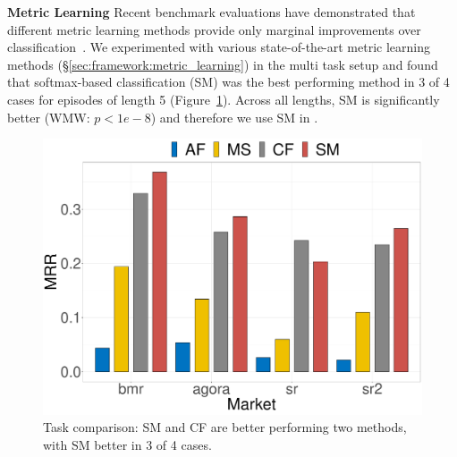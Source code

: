 \noindent \textbf{Metric Learning}
Recent benchmark evaluations have demonstrated that different metric learning methods provide only marginal improvements over classification~\cite{musgrave2020metric,Zhai2019ClassificationIA}. 
We experimented with various state-of-the-art metric learning methods (\S\ref{sec:framework:metric_learning}) in the multi task setup and found that softmax-based classification (SM) was the best performing method in 3 of 4 cases for episodes of length 5 (Figure~\ref{fig:metric_learning}). 
Across all lengths, SM is significantly better (WMW: $p < 1e-8$) and therefore we use SM in \SYSMLmethodname{}.

\begin{figure}[!htbp]
    \centering
    \includegraphics[width=0.8\linewidth]{sysml/plots/nce_comparison_multitask.pdf}
    \caption{Task comparison: SM and CF are better performing two methods, with SM better in 3 of 4 cases.}
    \label{fig:metric_learning}
\end{figure}


